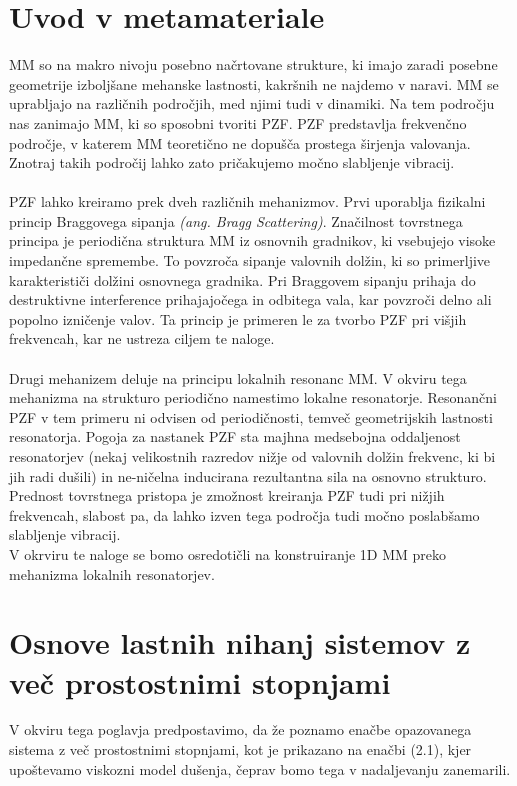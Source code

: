 \documentclass[12pt]{report}
\begin{document}
\section{Uvod v metamateriale}
\ac{MM} so na makro nivoju posebno načrtovane strukture, ki imajo zaradi posebne geometrije izboljšane
mehanske lastnosti, kakršnih ne najdemo v naravi. \ac{MM} se uprabljajo na različnih področjih,
med njimi tudi v dinamiki. Na tem področju nas zanimajo \ac{MM}, ki so sposobni tvoriti \ac{PZF}. \ac{PZF} 
predstavlja frekvenčno področje, v katerem \ac{MM} teoretično ne dopušča prostega širjenja valovanja.
Znotraj takih področij lahko zato pričakujemo močno slabljenje vibracij.
\\
\\
\ac{PZF} lahko kreiramo prek dveh različnih mehanizmov. Prvi uporablja fizikalni princip Braggovega sipanja
 \emph{(ang. Bragg Scattering)}. Značilnost tovrstnega principa je periodična struktura \ac{MM} iz osnovnih gradnikov,
 ki vsebujejo visoke impedančne spremembe. To povzroča sipanje valovnih dolžin, ki so primerljive karakterističi dolžini 
 osnovnega gradnika. Pri Braggovem sipanju prihaja do destruktivne interference prihajajočega in odbitega vala, kar povzroči
 delno ali popolno izničenje valov. Ta princip je primeren le za tvorbo \ac{PZF} pri višjih frekvencah, kar ne ustreza
 ciljem te naloge.
 \\
 \\
 Drugi mehanizem deluje na principu lokalnih resonanc \ac{MM}. V okviru tega mehanizma na strukturo periodično namestimo
 lokalne resonatorje. Resonančni \ac{PZF} v tem primeru ni odvisen od periodičnosti, temveč geometrijskih lastnosti resonatorja. 
 Pogoja za nastanek \ac{PZF} sta majhna medsebojna oddaljenost resonatorjev (nekaj velikostnih razredov nižje od valovnih dolžin frekvenc,
 ki bi jih radi dušili) in ne-ničelna inducirana rezultantna sila na osnovno strukturo. Prednost tovrstnega pristopa je zmožnost kreiranja
 \ac{PZF} tudi pri nižjih frekvencah, slabost pa, da lahko izven tega področja tudi močno poslabšamo slabljenje vibracij. \cite{kosir}
 \\
V okrviru te naloge se bomo osredotičli na konstruiranje 1D \ac{MM} preko mehanizma lokalnih resonatorjev.

\section{Osnove lastnih nihanj sistemov z več prostostnimi stopnjami}
V okviru tega poglavja predpostavimo, da že poznamo enačbe opazovanega sistema z več prostostnimi stopnjami, kot je 
prikazano na enačbi (2.1), kjer upoštevamo viskozni model dušenja, čeprav bomo tega v nadaljevanju zanemarili.
\end{document}
